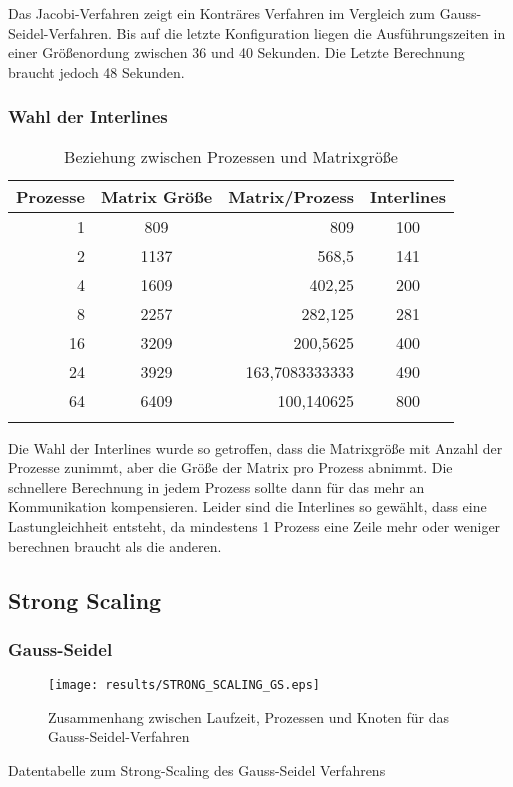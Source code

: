 \documentclass[a4paper,12pt]{scrartcl}
\begin{document}
Das Jacobi-Verfahren zeigt ein Konträres Verfahren im Vergleich zum Gauss-Seidel-Verfahren. 
Bis auf die letzte Konfiguration liegen die Ausführungszeiten in einer Größenordung zwischen 36 und 40 Sekunden.
Die Letzte Berechnung braucht jedoch 48 Sekunden.
\FloatBarrier
\subsubsection{Wahl der Interlines}
\begin{longtable}{r|c|r|c}
Prozesse&Matrix Größe&Matrix/Prozess&Interlines \\ \hline \endhead 

1	&809	&809	&100\\
2	&1137	&568,5	&141\\
4	&1609	&402,25	&200\\
8	&2257	&282,125	&281\\
16	&3209	&200,5625	&400\\
24	&3929	&163,7083333333	&490\\
64	&6409	&100,140625	&800\\
\caption{Beziehung zwischen Prozessen und Matrixgröße}
\end{longtable}
Die Wahl der Interlines wurde so getroffen, dass die Matrixgröße mit Anzahl der Prozesse zunimmt, aber die Größe der Matrix pro Prozess abnimmt. Die schnellere Berechnung in jedem Prozess sollte dann für das mehr an Kommunikation kompensieren.
Leider sind die Interlines so gewählt, dass eine Lastungleichheit entsteht, da mindestens 1 Prozess eine Zeile mehr oder weniger berechnen braucht als die anderen.
\FloatBarrier
\subsection{Strong Scaling}
\subsubsection{Gauss-Seidel}
\begin{figure}[hr!]
\texttt{[image: results/STRONG\_SCALING\_GS.eps]}
 \caption{Zusammenhang zwischen Laufzeit, Prozessen und Knoten für das Gauss-Seidel-Verfahren}
\end{figure}
\begin{table}[hl!]

\caption{Datentabelle zum Strong-Scaling des Gauss-Seidel Verfahrens}
\end{table}
\end{document}
